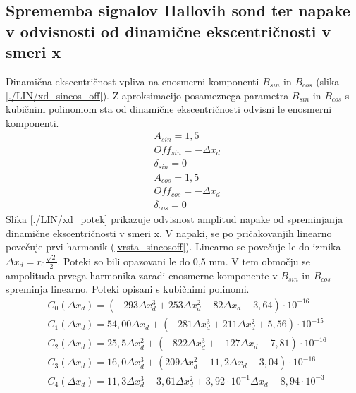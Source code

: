 \subsection{Sprememba signalov Hallovih sond ter napake v odvisnosti od dinamične ekscentričnosti v smeri x}
Dinamična ekscentričnost vpliva na enosmerni komponenti $B_{sin}$ in $B_{cos}$ (slika \ref{./LIN/xd_sincos_off}).
Z aproksimacijo posameznega parametra $B_{sin}$ in $B_{cos}$ s kubičnim polinomom sta od dinamične ekscentričnosti odvisni le enosmerni komponenti.
\begin{eqnarray}
\label{analog_lin_xd}
&A_{sin} = 1,5\\
&Off_{sin} = -\Delta x_d \\
&\delta_{sin} =0 \\
&A_{cos} = 1,5\\
&Off_{cos} = -\Delta x_d\\
&\delta_{cos} = 0
\end{eqnarray}
\newpage
Slika \ref{./LIN/xd_potek} prikazuje odvisnost amplitud napake od spreminjanja dinamične ekscentričnosti v smeri x. V napaki, se po pričakovanjih linearno povečuje prvi harmonik (\ref{vrsta_sincosoff}). Linearno se povečuje le do izmika $\Delta x_d = r_0 \frac{\sqrt{2}}{2}$. Poteki so bili opazovani le do 0,5 mm. V tem območju se ampolituda prvega harmonika zaradi enosmerne komponente v $B_{sin}$ in $B_{cos}$ spreminja linearno.
Poteki opisani s kubičnimi polinomi.
\begin{eqnarray}
\label{nap_lin_xd}
&C_0(\Delta x_d) =(-293\Delta x_d^{3}+253\Delta x_d^{2}-82\Delta x_d+3,64) \cdot 10^{-16}  \\
&C_1(\Delta x_d) = 54,00\Delta x_d+(-281\Delta x_d^{3}+211\Delta x_d^{2}+5,56) \cdot 10^{-15} \\      
&C_2(\Delta x_d) =25,5\Delta x_d^{2}+ (-822\Delta x_d^{3}+-127\Delta x_d+7,81)\cdot 10^{-16} \\      
&C_3(\Delta x_d) =16,0\Delta x_d^{3}+ (209\Delta x_d^{2}-11,2\Delta x_d-3,04)\cdot 10^{-16} \\       
&C_4(\Delta x_d) =11,3\Delta x_d^{3}-3,61\Delta x_d^{2}+3,92\cdot 10^{-1}\Delta x_d-8,94\cdot 10^{-3}
\end{eqnarray}
